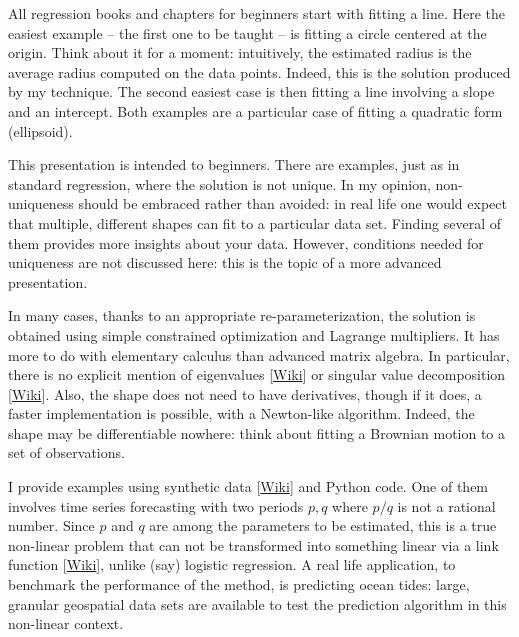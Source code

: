 \documentclass[oneside,10pt]{book}
\begin{document}
All regression books and chapters for beginners start with fitting a line. Here the easiest example -- the first one to be taught -- is fitting a circle centered at the origin. Think about it for a moment: intuitively, the estimated radius is the average radius computed on the data points. Indeed, this is the solution
 produced by my technique. The second easiest case is then fitting a line involving a slope and an intercept. Both examples are a particular case of fitting a quadratic form (ellipsoid). 

This presentation is intended to beginners. There are examples, just as in standard regression, where the solution is not unique. In my opinion, non-uniqueness should be embraced rather than avoided: in real life one would expect that multiple, different shapes can fit to a particular data set. Finding several of them provides more insights about your data. However, conditions needed for uniqueness are not discussed here: this is the topic of a more advanced presentation. 

In many cases, thanks to an appropriate re-parameterization, the solution is obtained using simple constrained optimization and Lagrange multipliers. It has more to do with elementary calculus than advanced matrix algebra. In particular, 
there is no explicit mention of \textcolor{index}{eigenvalues} 
[\href{https://en.wikipedia.org/wiki/Eigenvalues_and_eigenvectors}{Wiki}] or 
 \textcolor{index}{singular value decomposition} [\href{https://en.wikipedia.org/wiki/Singular_value_decomposition}{Wiki}]. Also, the shape does not need to have derivatives, though if it does, a faster implementation is possible, with a Newton-like algorithm. Indeed, the shape may be differentiable nowhere: think about fitting a Brownian motion to a set of observations. 

I provide examples using \textcolor{index}{synthetic data} [\href{https://en.wikipedia.org/wiki/Synthetic_data}{Wiki}] and Python code. One of them involves time series forecasting with two periods $p,q$ where $p/q$ is not a rational number. Since $p$ and $q$ are among the parameters to be estimated, this is a true non-linear problem that can not be transformed into something linear via a \textcolor{index}{link function} [\href{https://en.wikipedia.org/wiki/Generalized_linear_model#Link_function}{Wiki}], unlike (say) logistic regression.  
A real life application, to benchmark the performance of the method, is predicting ocean tides: large, granular geospatial data sets are available to test
 the prediction algorithm in this non-linear context. 
\end{document}
